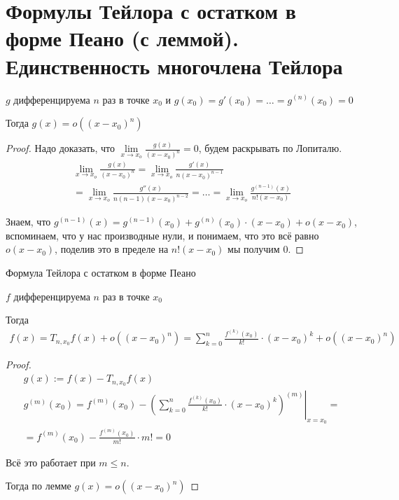 
\section{Формулы Тейлора с остатком в форме Пеано (с леммой). Единственность многочлена Тейлора \href{https://youtu.be/au9-34CerJM?t=4684}{\Walley}}

\begin{lemma}
    
    $g$ дифференцируема $n$ раз в точке $x_0$ и $g(x_0) = g'(x_0) = \dots = g^{(n)}(x_0) = 0$

    Тогда $g(x) = o((x - x_0)^n)$

    \begin{proof}
        
        Надо доказать, что $\lim\limits_{x \to x_o} \frac{g(x)}{(x-x_0)^n} = 0$,
        будем раскрывать по Лопиталю.
        \begin{gather*}
            \lim\limits_{x \to x_o} \frac{g(x)}{(x-x_0)^n} = \lim\limits_{x \to x_o} \frac{g'(x)}{n(x-x_0)^{n-1}} \\ 
            = \lim\limits_{x \to x_o} \frac{g''(x)}{n(n-1)(x-x_0)^{n-2}} = \dots = \lim\limits_{x \to x_o} \frac{g^{(n-1)}(x)}{n!(x-x_0)}
        \end{gather*}

        Знаем, что $g^{(n-1)}(x) = g^{(n-1)}(x_0) + g^{(n)}(x_0) \cdot (x - x_0) + o(x - x_0)$, вспоминаем,
        что у нас производные нули, и понимаем, что это всё равно $o(x - x_0)$, поделив это в пределе на $n!(x-x_0)$ мы получим $0$.

    \end{proof}

\end{lemma}


\begin{theorem-non}
    Формула Тейлора с остатком в форме Пеано

    $f$ дифференцируема $n$ раз в точке $x_0$

    Тогда 
    \begin{gather*}
        f(x) = T_{n, x_0} f(x) + o((x - x_0)^n) = \sum_{k=0}^{n} \frac{f^{(k)}(x_0)}{k!} \cdot (x - x_0)^k + o((x - x_0)^n)
    \end{gather*}

    \begin{proof}

            \begin{gather*}
                g(x) := f(x) - T_{n, x_0} f(x) \\
                g^{(m)}(x_0) = f^{(m)}(x_0) - \left.\left( \sum_{k = 0}^{n} \frac{f^{(k)}(x_0)}{k!} \cdot (x - x_0)^k \right) ^{(m)} \right|_{x = x_0} = \\
                = f^{(m)}(x_0) - \frac{f^{(m)}(x_0)}{m!} \cdot m! = 0
            \end{gather*}

            Всё это работает при $m \leqslant n$.

            Тогда по лемме $g(x) = o((x - x_0)^n)$
    \end{proof}
\end{theorem-non}

